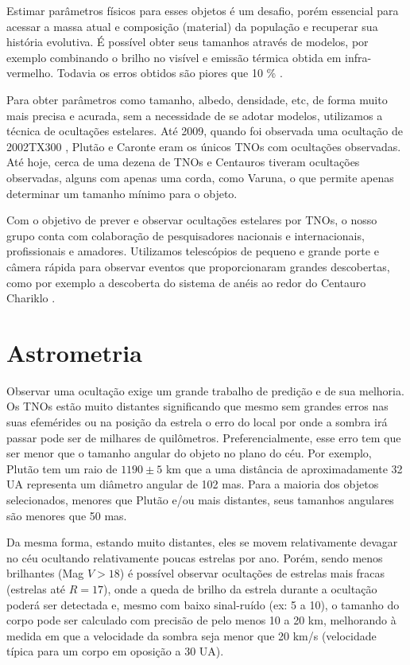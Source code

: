 \documentclass[12pt,a4paper]{monografia}
\begin{document}
Estimar parâmetros físicos para esses objetos é um desafio, porém essencial para acessar a massa atual e composição (material) da população e recuperar sua história evolutiva. É possível obter seus tamanhos através de modelos, por exemplo combinando o brilho no visível e emissão térmica obtida em infra-vermelho. Todavia os erros obtidos são piores que 10 \% \citep{Camargo2013}.

Para obter parâmetros como tamanho, albedo, densidade, etc, de forma muito mais precisa e acurada, sem a necessidade de se adotar modelos, utilizamos a técnica de ocultações estelares. Até 2009, quando foi observada uma ocultação de 2002TX300 \citep{Elliot2010}, Plutão e Caronte eram os únicos TNOs com ocultações observadas. Até hoje, cerca de uma dezena de TNOs e Centauros tiveram ocultações observadas, alguns com apenas uma corda, como Varuna, o que permite apenas determinar um tamanho mínimo para o objeto.

Com o objetivo de prever e observar ocultações estelares por TNOs, o nosso grupo conta com colaboração de pesquisadores nacionais e internacionais, profissionais e amadores. Utilizamos telescópios de pequeno e grande porte e câmera rápida para observar eventos que proporcionaram grandes descobertas, como por exemplo a descoberta do sistema de anéis ao redor do Centauro Chariklo \citep{BragaRibas2014}.



\section{Astrometria}
\label{Sec: TNOs-astrometria}

\indent \indent Observar uma ocultação exige um grande trabalho de predição e de sua melhoria. Os TNOs estão muito distantes significando que mesmo sem grandes erros nas suas efemérides ou na posição da estrela o erro do local por onde a sombra irá passar pode ser de milhares de quilômetros. Preferencialmente, esse erro tem que ser menor que o tamanho angular do objeto no plano do céu. Por exemplo, Plutão tem um raio de $1190 \pm 5$ km \cite[submetido]{DiasOliveira2015} que a uma distância de aproximadamente 32 UA representa um diâmetro angular de 102 mas. Para a maioria dos objetos selecionados, menores que Plutão e/ou mais distantes, seus tamanhos angulares são menores que 50 mas.

Da mesma forma, estando muito distantes, eles se movem relativamente devagar no céu ocultando relativamente poucas estrelas por ano. Porém, sendo menos brilhantes (Mag $V > 18$) é possível observar ocultações de estrelas mais fracas (estrelas até $R = 17$), onde a queda de brilho da estrela durante a ocultação poderá ser detectada e, mesmo com baixo sinal-ruído (ex: 5 a 10), o tamanho do corpo pode ser calculado com precisão de pelo menos 10 a 20 km, melhorando à medida em que a velocidade da sombra seja menor que 20 km/s (velocidade típica para um corpo em oposição a 30 UA).
\end{document}
